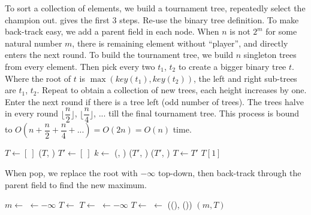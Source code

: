 \documentclass[b5paper]{article}
\begin{document}
To sort a collection of elements, we build a tournament tree, repeatedly select the champion out.  gives the first 3 steps. Re-use the binary tree definition. To make back-track easy, we add a parent field in each node. When $n$ is not $2^m$ for some natural number $m$, there is remaining element without ``player'', and directly enters the next round. To build the tournament tree, we build $n$ singleton trees from every element. Then pick every two $t_1$, $t_2$ to create a bigger binary tree $t$. Where the root of $t$ is $\max(key(t_1), key(t_2))$, the left and right sub-trees are $t_1$, $t_2$. Repeat to obtain a collection of new trees, each height increases by one. Enter the next round if there is a tree left (odd number of trees). The trees halve in every round $\lfloor \dfrac{n}{2} \rfloor$, $\lfloor \dfrac{n}{4} \rfloor$, ... till the final tournament tree. This process is bound to $O(n + \dfrac{n}{2} + \dfrac{n}{4} + ... ) = O(2n) = O(n)$ time.

\begin{algorithmic}[1]
  \State $T \gets [\ ]$
    \State {}($T$, )
  \EndFor
    \State $T' \gets [\ ]$
      \State $k \gets$ (, )
      \State {}($T'$, )
    \EndFor
      \State {}($T'$, )
    \EndIf
    \State $T \gets T'$
  \EndWhile
  \State \Return $T[1]$
\EndFunction
\end{algorithmic}

When pop, we replace the root with $-\infty$ top-down, then back-track through the parent field to find the new maximum.

\begin{algorithmic}[1]
  \State $m \gets$ 
  \State {} $\gets -\infty$
    
      \State $T \gets$ 
    \Else
      \State $T \gets$ 
    \EndIf
    \State {} $\gets -\infty$
  \EndWhile
   
    \State $T \gets$ 
    \State {} $\gets$ ((), ())
  \EndWhile
  \State \Return $(m, T)$ 
\EndFunction
\end{algorithmic}
\end{document}
